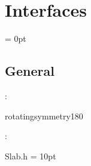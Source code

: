 
\section{Interfaces} 


\parskip = 0pt

\vspace{3mm} \subsection*{General}

: 

rotatingsymmetry180
\vspace{2mm}

\vspace{5mm}

: 

Slab.h
\vspace{2mm}\parskip = 10pt 
